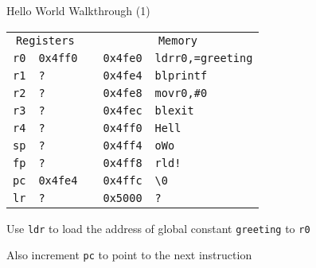 \begin{frame}{Hello World Walkthrough (1)}
	\begin{alltt}
		\begin{tabular}{ r | l p{5mm} r | l }
			\multicolumn{2}{c}{Registers} &        & \multicolumn{2}{c}{Memory}                              \\
			r0                            & 0x4ff0 &                            & 0x4fe0 & ldr r0, =greeting \\
			r1                            & ?      &                            & 0x4fe4 & bl printf         \\
			r2                            & ?      &                            & 0x4fe8 & mov r0, \#0       \\
			r3                            & ?      &                            & 0x4fec & bl exit           \\
			r4                            & ?      &                            & 0x4ff0 & Hell              \\
			sp                            & ?      &                            & 0x4ff4 & o Wo              \\
			fp                            & ?      &                            & 0x4ff8 & rld!              \\
			pc                            & 0x4fe4 &                            & 0x4ffc & {\textbackslash}0 \\
			lr                            & ?      &                            & 0x5000 & ?                 \\
		\end{tabular}
	\end{alltt}

	Use \texttt{ldr} to load the address of global constant \texttt{greeting} to \texttt{r0}

	Also increment \texttt{pc} to point to the next instruction

\end{frame}


